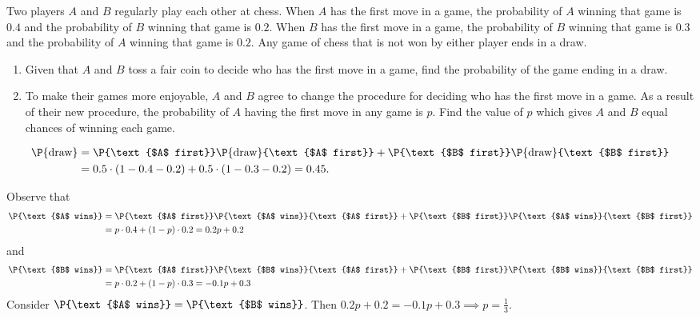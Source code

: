 \begin{problem}
    Two players $A$ and $B$ regularly play each other at chess. When $A$ has the first move in a game, the probability of $A$ winning that game is $0.4$ and the probability of $B$ winning that game is $0.2$. When $B$ has the first move in a game, the probability of $B$ winning that game is $0.3$ and the probability of $A$ winning that game is $0.2$. Any game of chess that is not won by either player ends in a draw.
    \begin{enumerate}
        \item Given that $A$ and $B$ toss a fair coin to decide who has the first move in a game, find the probability of the game ending in a draw.
        \item To make their games more enjoyable, $A$ and $B$ agree to change the procedure for deciding who has the first move in a game. As a result of their new procedure, the probability of $A$ having the first move in any game is $p$. Find the value of $p$ which gives $A$ and $B$ equal chances of winning each game.
    \end{enumerate}
\end{problem}
\begin{solution}
    \begin{ppart}
        \begin{align*}
            \P{\text{draw}} &= \P{\text{$A$ first}}\P{\text{draw}}{\text{$A$ first}} + \P{\text{$B$ first}}\P{\text{draw}}{\text{$B$ first}}\\
            &= 0.5 \cdot (1 - 0.4 - 0.2) + 0.5 \cdot (1 - 0.3 - 0.2) = 0.45.
        \end{align*}
    \end{ppart}
    \begin{ppart}
        Observe that 
        \begin{align*}
            \P{\text{$A$ wins}} &= \P{\text{$A$ first}}\P{\text{$A$ wins}}{\text{$A$ first}} + \P{\text{$B$ first}}\P{\text{$A$ wins}}{\text{$B$ first}}\\
            &= p \cdot 0.4 + (1-p) \cdot 0.2 = 0.2p + 0.2
        \end{align*}
        and
        \begin{align*}
            \P{\text{$B$ wins}} &= \P{\text{$A$ first}}\P{\text{$B$ wins}}{\text{$A$ first}} + \P{\text{$B$ first}}\P{\text{$B$ wins}}{\text{$B$ first}}\\
            &= p \cdot 0.2 + (1-p) \cdot 0.3 = -0.1p + 0.3
        \end{align*}
        Consider $\P{\text{$A$ wins}} = \P{\text{$B$ wins}}$. Then $0.2p + 0.2 = -0.1p + 0.3 \implies p = \frac13$.
    \end{ppart}
\end{solution}

